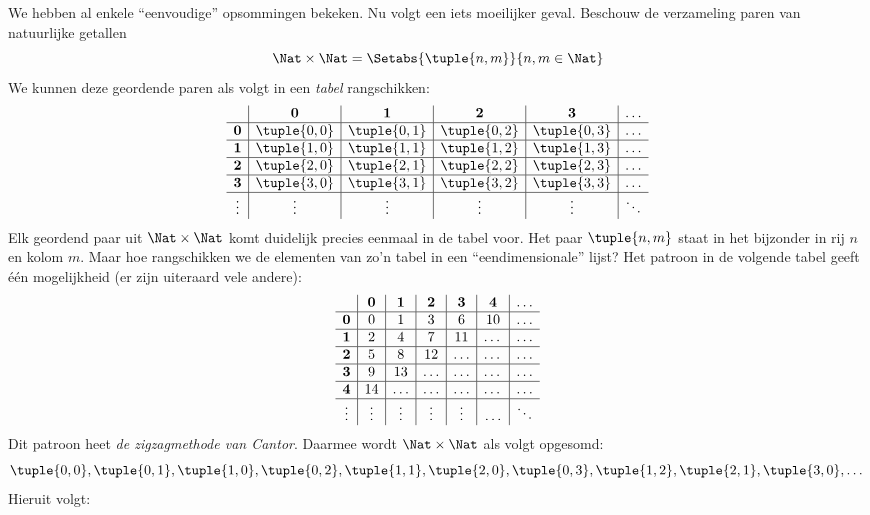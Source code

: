 \documentclass[../../../include/open-logic-section]{subfiles}
\begin{document}


\begin{explain}
We hebben al enkele ``eenvoudige'' opsommingen bekeken. Nu volgt een
iets moeilijker geval. Beschouw de verzameling paren van natuurlijke
getallen
\[
\Nat \times \Nat = \Setabs{\tuple{n,m}}{n,m \in \Nat}
\]
We kunnen deze geordende paren als volgt in een \emph{tabel} rangschikken:
\[
\begin{array}{ c | c | c | c | c | c}
& \mathbf 0 & \mathbf 1 & \mathbf 2 & \mathbf 3 & \dots \\
\hline
\mathbf 0 & \tuple{0,0} & \tuple{0,1} & \tuple{0,2} & \tuple{0,3} & \dots \\
\hline
\mathbf 1 & \tuple{1,0} & \tuple{1,1} & \tuple{1,2} & \tuple{1,3} & \dots \\
\hline
\mathbf 2 & \tuple{2,0} & \tuple{2,1} & \tuple{2,2} & \tuple{2,3} & \dots \\
\hline
\mathbf 3 & \tuple{3,0} & \tuple{3,1} & \tuple{3,2} & \tuple{3,3} & \dots \\
\hline
\vdots & \vdots & \vdots & \vdots & \vdots & \ddots\\
\end{array}
\]
Elk geordend paar uit $\Nat \times \Nat$ komt duidelijk precies eenmaal in de
tabel voor. Het paar $\tuple{n,m}$ staat in het bijzonder in rij $n$ en kolom
$m$. Maar hoe rangschikken we de elementen van zo'n tabel in een
``eendimensionale'' lijst? Het patroon in de volgende tabel geeft één
mogelijkheid (er zijn uiteraard vele andere):
\[
\begin{array}{ c | c | c | c | c | c | c}
& \mathbf 0 & \mathbf 1 & \mathbf 2 & \mathbf 3 & \mathbf 4 &\dots \\
\hline
\mathbf 0 & 0  & 1& 3 & 6& 10 &\ldots \\
\hline
\mathbf 1 &2 & 4& 7 & 11 & \dots &\ldots \\
\hline
\mathbf 2 & 5 & 8 & 12 & \ldots & \dots&\ldots \\
\hline
\mathbf 3 & 9 & 13 & \ldots & \ldots & \dots & \ldots \\
\hline
\mathbf 4 & 14 & \ldots & \ldots & \ldots & \dots & \ldots \\
\hline
\vdots & \vdots & \vdots & \vdots & \vdots&\ldots & \ddots\\
\end{array}
\]\noindent
Dit patroon heet \emph{de zigzagmethode van Cantor}. Daarmee wordt
$\Nat \times \Nat$ als volgt opgesomd:
\[
\tuple{0,0}, \tuple{0,1}, \tuple{1,0}, \tuple{0,2}, \tuple{1,1},
\tuple{2,0}, \tuple{0,3}, \tuple{1,2}, \tuple{2,1}, \tuple{3,0}, \dots
\]
Hieruit volgt:
\end{explain}
\end{document}
